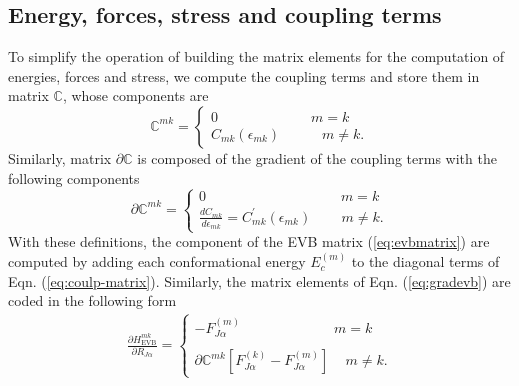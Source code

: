\subsection{Energy, forces, stress and coupling terms}
To simplify the operation of building the matrix elements for the computation of energies, forces and stress, we compute the coupling terms and store them in matrix $\mathds{C}$, whose components are
\begin{equation}\label{eq:coulp-matrix}
\mathds{C}^{mk}=\begin{cases} 0 \,\,\,\,\,\,\,\,\,\,\,\,\,\,\,\,\,\,\,\,\,\,\,\,\,\,\,\,\,\,\,\,\,\,\,\,\,\,\,\,  m=k   \\
                                               C_{mk}(\epsilon_{mk})   \,\,\,\,\,\,\,\,\,\,\,\,\,\,\,\,\,\,   m \ne k.
                                              \end{cases}
\end{equation}
Similarly, matrix $\partial\mathds{C}$ is composed of the gradient of the coupling terms with the following components
\begin{equation}\label{eq:grad-coulp-matrix}
\partial\mathds{C}^{mk}=\begin{cases} 0 \,\,\,\,\,\,\,\,\,\,\,\,\,\,\,\,\,\,\,\,\,\,\,\,\,\,\,\,\,\,\,\,\,\,\,\,\,\,\,\,\,\,\,\,\,\,\,\,\,\,\,\,\,\,\,\,\,\,  m=k   \\
                                                        \frac{dC_{mk}}{d\epsilon_{mk}}=C^{\prime}_{mk}(\epsilon_{mk})   \,\,\,\,\,\,\,\,\,\,\,\,\,   m \ne k.
                                     \end{cases}
\end{equation}
With these definitions, the component of the EVB matrix (\ref{eq:evbmatrix}) are computed by adding each conformational energy $E_{c}^{(m)}$ to the diagonal terms of Eqn. (\ref{eq:coulp-matrix}). Similarly, the matrix elements of Eqn. (\ref{eq:gradevb}) are coded in the following form
 \begin{eqnarray}\label{eq:grad-force-comp}
\frac{\partial H^{mk}_{\text{EVB}}}{\partial R_{J\alpha}}
=\begin{cases}
  -F^{(m)}_{J\alpha} \,\,\,\,\,\,\,\,\,\,\,\,\,\,\,\,\,\,\,\,\,\,\,\,\,\,\,\,\,\,\,\,\,\,\,\,\,\,\,\,  m=k  \\
\\
   \partial\mathds{C}^{mk} [F^{(k)}_{J\alpha}-F^{(m)}_{J\alpha}]  \,\,\,\,\,\,\,            m \ne k.
\end{cases} 
\end{eqnarray}
